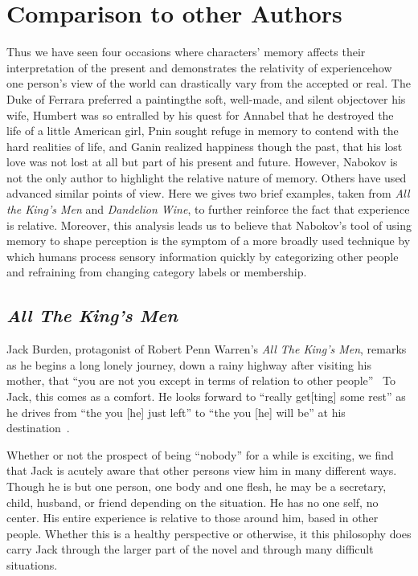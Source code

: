 \section{Comparison to other Authors}

Thus we have seen four occasions where characters' memory affects their interpretation of the present and demonstrates the relativity of experience\textemdash how one person's view of the world can drastically vary from the accepted or real.
The Duke of Ferrara preferred a painting\textemdash the soft, well-made, and silent object\textemdash over his wife, Humbert was so entralled by his quest for Annabel that he destroyed the life of a little American girl, Pnin sought refuge in memory to contend with the hard realities of life, and Ganin realized happiness though the past, that his lost love was not lost at all but part of his present and future.
However, Nabokov is not the only author to highlight the relative nature of memory.
Others have used advanced similar points of view. 
Here we gives two brief examples, taken from \emph{All the King's Men} and \emph{Dandelion Wine}, to further reinforce the fact that experience is relative.
Moreover, this analysis leads us to believe that Nabokov's tool of using memory to shape perception is the symptom of a more broadly used technique by which humans process sensory information quickly by categorizing other people and refraining from changing category labels or membership.

\vspace{1cm}
\subsection{\emph{All The King's Men}}
Jack Burden, protagonist of Robert Penn Warren's \emph{All The King's Men}, remarks as he begins a long lonely journey, down a rainy highway after visiting his mother, that ``you are not you except in terms of relation to other people''~\cite{warren1982all}
To Jack, this comes as a comfort.
He looks forward to ``really get[ting] some rest'' as he drives from ``the you [he] just left'' to ``the you [he] will be'' at his destination~\cite[88]{warren1982all}.

Whether or not the prospect of being ``nobody'' for a while is exciting, we find that Jack is acutely aware that other persons view him in many different ways. 
Though he is but one person, one body and one flesh, he may be a secretary, child, husband, or friend depending on the situation. %
He has no one self, no center. 
His entire experience is relative to those around him, based in other people. 
Whether this is a healthy perspective or otherwise, it this philosophy does carry Jack through the larger part of the novel and through many difficult situations.

